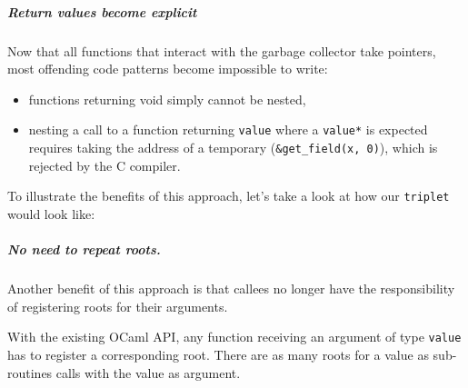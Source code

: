 \documentclass[a4paper]{easychair}
\begin{document}
\hypertarget{return-values-become-explicit}{%
\subparagraph{Return values become
explicit}\label{return-values-become-explicit}}

Now that all functions that interact with the garbage collector take
pointers, most offending code patterns become impossible to write:

\begin{itemize}
\tightlist
\item
  functions returning void simply cannot be nested,
\item
  nesting a call to a function returning \texttt{value} where a
  \texttt{value*} is expected requires taking the address of a temporary
  (\texttt{\&get\_field(x,\ 0)}), which is rejected by the C compiler.
\end{itemize}

To illustrate the benefits of this approach, let's take a look at how
our \texttt{triplet} would look like:

\begin{Shaded}
\begin{Highlighting}[]
 
\NormalTok{\{}
\NormalTok{, }\NormalTok{);}
\NormalTok{\}}

\NormalTok{\{}
\NormalTok{\}}
\end{Highlighting}
\end{Shaded}

\hypertarget{no-need-to-repeat-roots.}{%
\subparagraph{No need to repeat roots.}\label{no-need-to-repeat-roots.}}

Another benefit of this approach is that callees no longer have the
responsibility of registering roots for their arguments.

With the existing OCaml API, any function receiving an argument of type
\texttt{value} has to register a corresponding root. There are as many
roots for a value as sub-routines calls with the value as argument.

\begin{Shaded}
\begin{Highlighting}[]
\end{Highlighting}
\end{Shaded}
\end{document}
